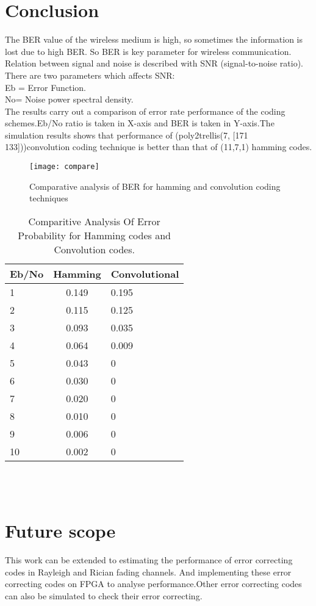 \documentclass[conference]{IEEEtran}
\begin{document}
\section{Conclusion}
The BER value of the
wireless medium is high, so sometimes the information is lost due to high BER. So BER is key parameter for wireless communication. Relation between signal and noise is
described with SNR (signal-to-noise ratio). There are two parameters which affects SNR:\\
Eb = Error Function.\\
No= Noise power spectral density.\\
The results carry out a comparison of error rate performance of the coding schemes.Eb/No ratio is taken in X-axis and BER is taken in Y-axis.The simulation results shows that performance of (poly2trellis(7, [171 133]))convolution coding technique is better than that of (11,7,1) hamming codes.\\ 
\begin{figure}[h]
\texttt{[image: compare]}
\caption{Comparative analysis of BER for hamming and convolution coding techniques}
\label{fig:compare}
\end{figure}
\begin{table}[h]
\begin{tabular}{| l | c | l |}
\hline
Eb/No & Hamming & Convolutional\\
\hline
1 & 0.149 & 0.195\\
2 & 0.115 & 0.125\\
3 & 0.093 & 0.035\\
4 & 0.064 & 0.009\\
5 & 0.043 & 0\\
6 & 0.030 & 0\\
7 & 0.020 & 0\\
8 & 0.010 & 0\\
9 & 0.006 & 0\\
10 &0.002 & 0\\
\hline
\end{tabular}
\caption{Comparitive Analysis Of Error Probability for Hamming codes and Convolution codes.}
\end{table}\\
\\
\section{Future scope}
This work can be extended to estimating the performance of error correcting codes in Rayleigh and Rician fading channels. And implementing these error correcting codes on FPGA to analyse performance.Other error correcting codes can also be simulated to check their error correcting.
\end{document}
